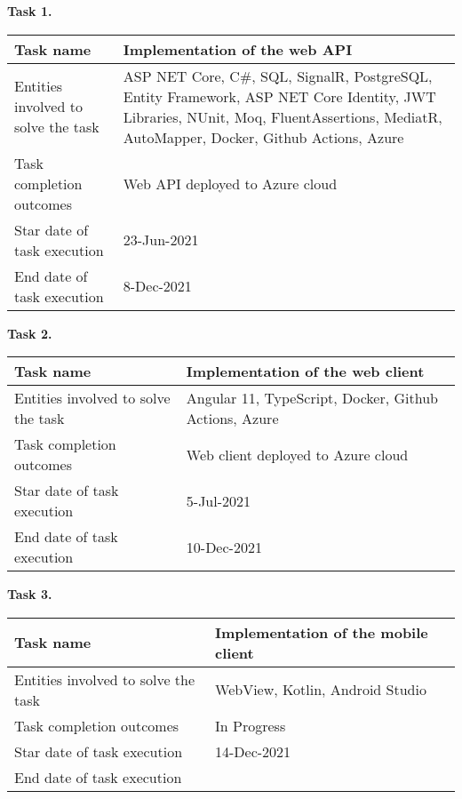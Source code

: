 \textbf{Task 1.}\\
\begin{tabular}{|p{}|p{}|}
    \hline
    Task name                   & Implementation of the web API   \\
    \hline
    Entities involved to solve the task & ASP NET Core, C\#, SQL, SignalR, PostgreSQL,
    Entity Framework, ASP NET Core Identity,
    JWT Libraries, NUnit, Moq, FluentAssertions, MediatR, AutoMapper, Docker, Github Actions, Azure \\
    \hline
    Task completion outcomes    & Web API deployed to Azure cloud \\
    \hline
    Star date of task execution & 23-Jun-2021                     \\
    \hline
    End date of task execution  & 8-Dec-2021                      \\
    \hline
\end{tabular}
\vskip 5mm
\hspace*{-6mm}\textbf{Task 2.}\\
\begin{tabular}{|p{}|p{}|}
    \hline
    Task name                           & Implementation of the web client                      \\
    \hline
    Entities involved to solve the task & Angular 11, TypeScript, Docker, Github Actions, Azure \\
    \hline
    Task completion outcomes            & Web client deployed to Azure cloud                    \\
    \hline
    Star date of task execution         & 5-Jul-2021                                            \\
    \hline
    End date of task execution          & 10-Dec-2021                                           \\
    \hline
\end{tabular}
\vskip 5mm
\hspace*{-6mm}\textbf{Task 3.}\\
\begin{tabular}{|p{}|p{}|}
    \hline
    Task name                           & Implementation of the mobile client \\
    \hline
    Entities involved to solve the task & WebView, Kotlin, Android Studio     \\
    \hline
    Task completion outcomes            & In Progress                         \\
    \hline
    Star date of task execution         & 14-Dec-2021                         \\
    \hline
    End date of task execution          &                                     \\
    \hline
\end{tabular}
